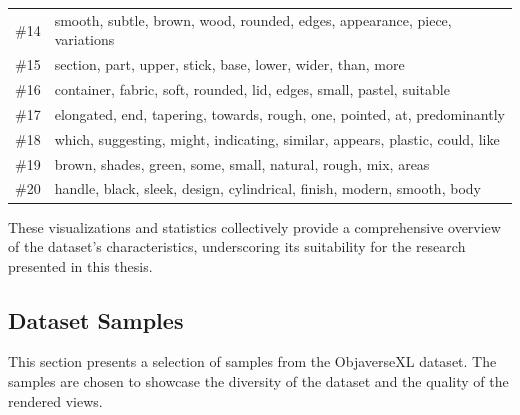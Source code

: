 \begin{table}[h]
\begin{tabular}{ll}
    \#14 & smooth, subtle, brown, wood, rounded, edges, appearance, piece, variations \\
    \#15 & section, part, upper, stick, base, lower, wider, than, more \\
    \#16 & container, fabric, soft, rounded, lid, edges, small, pastel, suitable \\
    \#17 & elongated, end, tapering, towards, rough, one, pointed, at, predominantly \\
    \#18 & which, suggesting, might, indicating, similar, appears, plastic, could, like \\
    \#19 & brown, shades, green, some, small, natural, rough, mix, areas \\
    \#20 & handle, black, sleek, design, cylindrical, finish, modern, smooth, body \\
    \bottomrule
  \end{tabular}
\end{table}

These visualizations and statistics collectively provide a comprehensive overview of the dataset's characteristics, underscoring its suitability for the research presented in this thesis.

\subsection{Dataset Samples}\label{ssec:dataset-samples}
This section presents a selection of samples from the ObjaverseXL dataset. The samples are chosen to showcase the diversity of the dataset and the quality of the rendered views.
